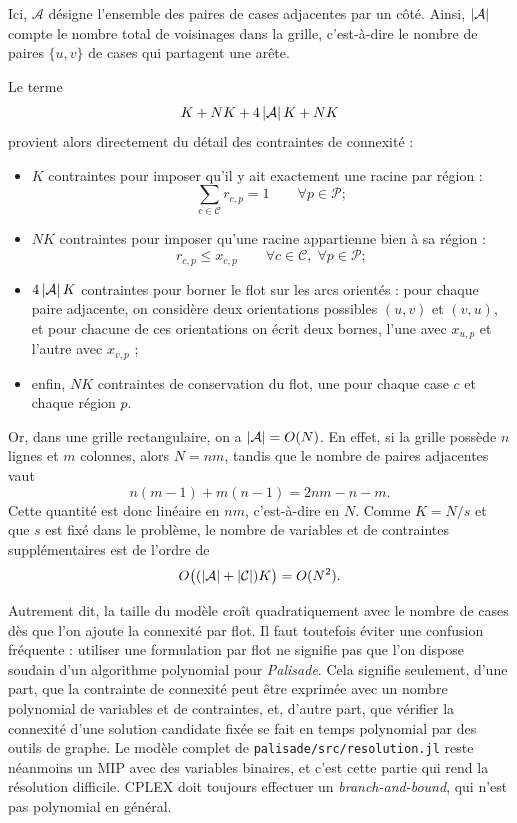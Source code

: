 Ici, \(\mathcal{A}\) désigne l'ensemble des paires de cases adjacentes par un côté. Ainsi, \(\left|\mathcal{A}\right|\) compte le nombre total de voisinages dans la grille, c'est-à-dire le nombre de paires \(\{u,v\}\) de cases qui partagent une arête.

Le terme
\[
K + NK + 4\left|\mathcal{A}\right|K + NK
\]
provient alors directement du détail des contraintes de connexité :
\begin{itemize}
    \item \(K\) contraintes pour imposer qu'il y ait exactement une racine par région :
    \[
    \sum_{c \in \mathcal{C}} r_{c,p} = 1
    \qquad \forall p \in \mathcal{P} ;
    \]
    \item \(NK\) contraintes pour imposer qu'une racine appartienne bien à sa région :
    \[
    r_{c,p} \leq x_{c,p}
    \qquad \forall c \in \mathcal{C},\; \forall p \in \mathcal{P} ;
    \]
    \item \(4\left|\mathcal{A}\right|K\) contraintes pour borner le flot sur les arcs orientés : pour chaque paire adjacente, on considère deux orientations possibles \((u,v)\) et \((v,u)\), et pour chacune de ces orientations on écrit deux bornes, l'une avec \(x_{u,p}\) et l'autre avec \(x_{v,p}\) ;
    \item enfin, \(NK\) contraintes de conservation du flot, une pour chaque case \(c\) et chaque région \(p\).
\end{itemize}

Or, dans une grille rectangulaire, on a \(\left|\mathcal{A}\right| = O(N)\). En effet, si la grille possède \(n\) lignes et \(m\) colonnes, alors \(N = nm\), tandis que le nombre de paires adjacentes vaut
\[
n(m-1) + m(n-1) = 2nm - n - m.
\]
Cette quantité est donc linéaire en \(nm\), c'est-à-dire en \(N\). Comme \(K = N/s\) et que \(s\) est fixé dans le problème, le nombre de variables et de contraintes supplémentaires est de l'ordre de
\[
O\big((\left|\mathcal{A}\right| + \left|\mathcal{C}\right|)K\big) = O(N^2).
\]

Autrement dit, la taille du modèle croît quadratiquement avec le nombre de cases dès que l'on ajoute la connexité par flot. Il faut toutefois éviter une confusion fréquente : utiliser une formulation par flot ne signifie pas que l'on dispose soudain d'un algorithme polynomial pour \textit{Palisade}. Cela signifie seulement, d'une part, que la contrainte de connexité peut être exprimée avec un nombre polynomial de variables et de contraintes, et, d'autre part, que vérifier la connexité d'une solution candidate fixée se fait en temps polynomial par des outils de graphe. Le modèle complet de \texttt{palisade/src/resolution.jl} reste néanmoins un MIP avec des variables binaires, et c'est cette partie qui rend la résolution difficile. CPLEX doit toujours effectuer un \textit{branch-and-bound}, qui n'est pas polynomial en général.

